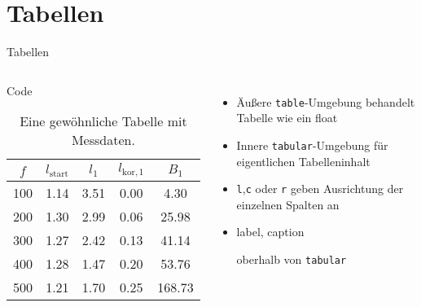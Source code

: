 \section{Tabellen}

\begin{frame}[fragile]{Tabellen}
  \begin{columns}[T]
    \fontsize{8}{6}
    \begin{block}{Code}
      \begin{lstverbatim}
      \begin{table}
        \centering
        \caption{Eine gewöhnliche Tabelle mit Messdaten.}
        \label{tab:some_data}
        \begin{tabular}{c c c c c}
          \hline
          $f$ & $l_\text{start}$ & $l_1$ & $l_{\text{kor},1}$ & $B_1$ \\
          \hline
          100 & 1.14 & 3.51 & 0.00 &   4.30 \\
          200 & 1.30 & 2.99 & 0.06 &  25.98 \\
          300 & 1.27 & 2.42 & 0.13 &  41.14 \\
          400 & 1.28 & 1.47 & 0.20 &  53.76 \\
          500 & 1.21 & 1.70 & 0.25 & 168.73 \\
          \hline
        \end{tabular}
      \end{table}
      \end{lstverbatim}
    \end{block}
    \begin{itemize}
      \item Äußere \texttt{table}-Umgebung behandelt Tabelle wie ein float
      \item Innere \texttt{tabular}-Umgebung für eigentlichen Tabelleninhalt
      \item \texttt{l},\texttt{c} oder \texttt{r} geben Ausrichtung der einzelnen Spalten an
      \item
        \begin{lstverbatim}
        label, caption
        \end{lstverbatim}
        oberhalb von \texttt{tabular}
    \end{itemize}
  \end{columns}
\end{frame}


